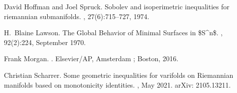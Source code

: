 \documentclass[11pt]{article}
\begin{document}
\begin{thebibliography}{EWW02}
David Hoffman and Joel Spruck.
\newblock Sobolev and isoperimetric inequalities for riemannian submanifolds.
, 27(6):715--727, 1974.

H.~Blaine Lawson.
\newblock The {Global} {Behavior} of {Minimal} {Surfaces} in
  \${S}{\textasciicircum}n\$.
, 92(2):224, September 1970.

Frank Morgan.
.
\newblock Elsevier/AP, Amsterdam ; Boston, 2016.

Christian Scharrer.
\newblock Some geometric inequalities for varifolds on {Riemannian} manifolds
  based on monotonicity identities.
, May 2021.
\newblock arXiv: 2105.13211.

\end{thebibliography}
\end{document}
